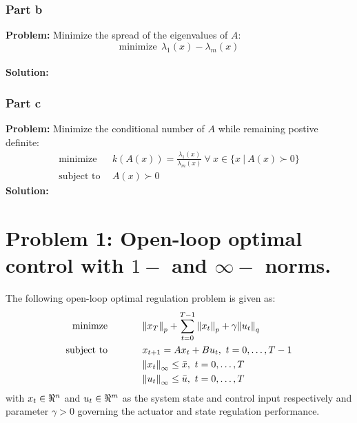 \documentclass[letter]{article}
\begin{document}
\subsubsection{Part b}
\textbf{Problem:}
Minimize the spread of the eigenvalues of $A$: $$\text{minimize} \ \ \lambda_1(x) - \lambda_m(x)$$\\
\textbf{Solution:}










\subsubsection{Part c}
\textbf{Problem:}
Minimize the conditional number of $A$ while remaining postive definite:
\begin{equation*}
	\begin{aligned}
		\text{minimize} \ \ &k(A(x)) = \frac{\lambda_1(x)}{\lambda_m(x)} \ \forall \ x \in \{x \ | \ A(x) \succ 0\}\\
		 \text{subject to} \ \ &A(x) \succ 0
	\end{aligned}
\end{equation*}
\textbf{Solution:}














\newpage
\section{Problem 1: Open-loop optimal control with $1-$ and $\infty-$ norms.}
The following open-loop optimal regulation problem is given as:
\begin{equation}\label{eq:open-loop_opt-control_def}
	\begin{aligned}
		\text{minimze} \hspace{0.5in}&\norm{x_T}_p + \sum_{t = 0}^{T-1} \norm{x_t}_p + \gamma\norm{u_t}_q\\
		\text{subject to} \hspace{0.5in} 	& x_{t+1} = A x_t + B u_t, \ t = 0,\dots,T-1\\
							& \norm{x_t}_\infty \leq \bar{x}, \ t = 0,\dots,T\\
							 & \norm{u_t}_\infty \leq \bar{u}, \ t = 0,\dots,T
	\end{aligned}
\end{equation}
with $x_t \in \real^n$ and $u_t \in \real^m$ as the system state and control input respectively and parameter $\gamma > 0$ governing the actuator and state regulation performance.\\
\end{document}
